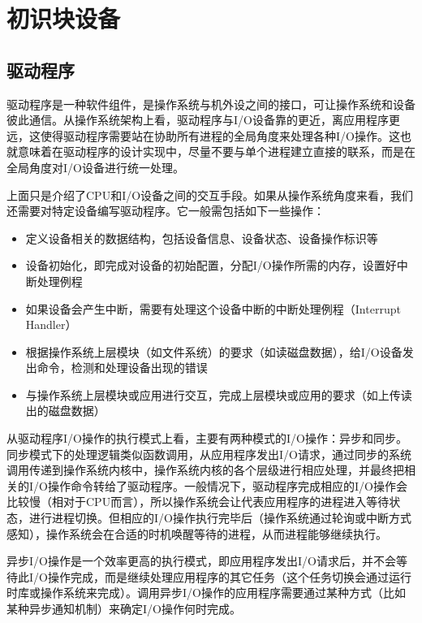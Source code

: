 \chapter{初识块设备}
\section{驱动程序}

驱动程序是一种软件组件，是操作系统与机外设之间的接口，可让操作系统和设备彼此通信。从操作系统架构上看，驱动程序与I/O设备靠的更近，离应用程序更远，这使得驱动程序需要站在协助所有进程的全局角度来处理各种I/O操作。这也就意味着在驱动程序的设计实现中，尽量不要与单个进程建立直接的联系，而是在全局角度对I/O设备进行统一处理。
	
上面只是介绍了CPU和I/O设备之间的交互手段。如果从操作系统角度来看，我们还需要对特定设备编写驱动程序。它一般需包括如下一些操作：
	
\begin{itemize}
	\item 定义设备相关的数据结构，包括设备信息、设备状态、设备操作标识等
	\item 设备初始化，即完成对设备的初始配置，分配I/O操作所需的内存，设置好中断处理例程
	\item 如果设备会产生中断，需要有处理这个设备中断的中断处理例程（Interrupt Handler）
	\item 根据操作系统上层模块（如文件系统）的要求（如读磁盘数据），给I/O设备发出命令，检测和处理设备出现的错误
	\item 与操作系统上层模块或应用进行交互，完成上层模块或应用的要求（如上传读出的磁盘数据）
\end{itemize}
	
从驱动程序I/O操作的执行模式上看，主要有两种模式的I/O操作：异步和同步。同步模式下的处理逻辑类似函数调用，从应用程序发出I/O请求，通过同步的系统调用传递到操作系统内核中，操作系统内核的各个层级进行相应处理，并最终把相关的I/O操作命令转给了驱动程序。一般情况下，驱动程序完成相应的I/O操作会比较慢（相对于CPU而言），所以操作系统会让代表应用程序的进程进入等待状态，进行进程切换。但相应的I/O操作执行完毕后（操作系统通过轮询或中断方式感知），操作系统会在合适的时机唤醒等待的进程，从而进程能够继续执行。
		
异步I/O操作是一个效率更高的执行模式，即应用程序发出I/O请求后，并不会等待此I/O操作完成，而是继续处理应用程序的其它任务（这个任务切换会通过运行时库或操作系统来完成）。调用异步I/O操作的应用程序需要通过某种方式（比如某种异步通知机制）来确定I/O操作何时完成。
	
\clearpage
